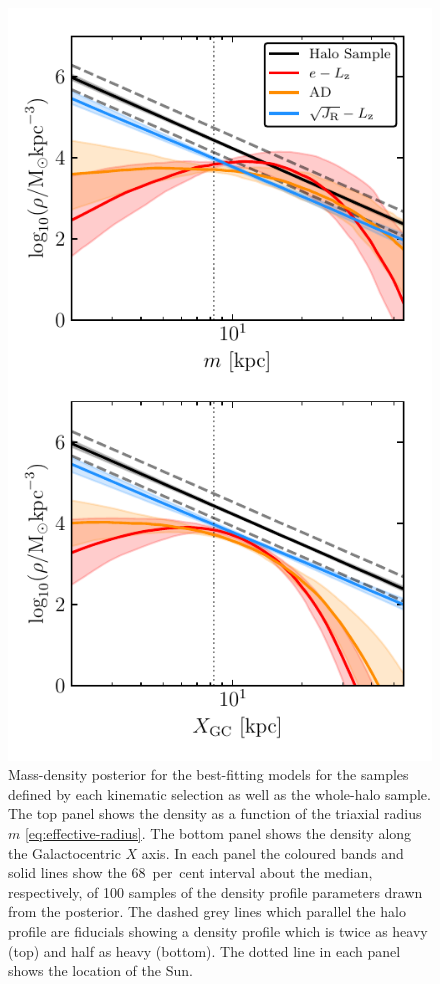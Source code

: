 \begin{figure}
    \centering
    \includegraphics[width=\halftextwidth]{figure/ch3/pdensity_gcx.pdf}
    \caption{Mass-density posterior for the best-fitting models for the \gse samples defined by each kinematic selection as well as the whole-halo sample. The top panel shows the density as a function of the triaxial radius $m$ \eqref{eq:effective-radius}. The bottom panel shows the density along the Galactocentric $X$ axis. In each panel the coloured bands and solid lines show the 68~per~cent interval about the median, respectively, of 100 samples of the density profile parameters drawn from the posterior. The dashed grey lines which parallel the halo profile are fiducials showing a density profile which is twice as heavy (top) and half as heavy (bottom). The dotted line in each panel shows the location of the Sun.}
    \label{fig:pdensity}
\end{figure}

